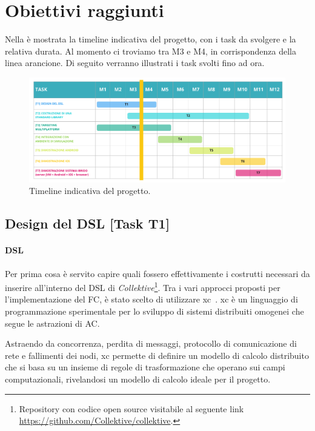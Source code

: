 \documentclass[13pt, a4paper]{scrartcl}
\newcommand{\ck}{\emph{Collektive}}
\begin{document}
\section{Obiettivi raggiunti}\label{sec:obiettivi-raggiunti}

Nella  è mostrata la timeline indicativa del progetto, con i task da svolgere e la relativa durata.
%
Al momento ci troviamo tra M3 e M4, in corrispondenza della linea arancione.
%
Di seguito verranno illustrati i task svolti fino ad ora.

\begin{figure}
    \centering
    \includegraphics[width=\textwidth]{images/collektive_timeline}
    \caption{Timeline indicativa del progetto.}
    \label{fig:timeline}
\end{figure}

\subsection{Design del DSL [Task T1]}\label{subsec:t1}

\paragraph{DSL}
Per prima cosa è servito capire quali fossero effettivamente i costrutti necessari da inserire all'interno del DSL di \ck{}\footnote{
    Repository con codice open source visitabile al seguente link \url{https://github.com/Collektive/collektive}.
}.
%
Tra i vari approcci proposti per l'implementazione del \ac{FC}, è stato scelto di utilizzare \ac{xc}~\cite{AudritoCDSV24}.
%
\ac{xc} è un linguaggio di programmazione sperimentale per lo sviluppo di sistemi distribuiti omogenei che segue le astrazioni
    di \ac{AC}.

Astraendo da concorrenza, perdita di messaggi, protocollo di comunicazione di rete e fallimenti dei nodi,
    \ac{xc} permette di definire un modello di calcolo distribuito che si basa su un insieme di regole di trasformazione
    che operano sui campi computazionali,
    rivelandosi un modello di calcolo ideale per il progetto.
\end{document}
